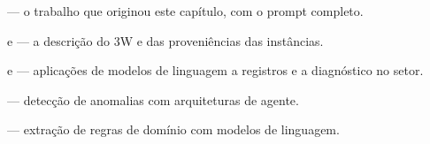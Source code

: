 \begin{leituras}
\item \citet{Lopes2026LLM} --- o trabalho que originou este capítulo, com o prompt
      completo.
\item \citet{VARGAS2019} e \citet{VazVargas2026_3w2} --- a descrição do 3W e das
      proveniências das instâncias.
\item \citet{Ma2024wellrecords} e \citet{Wei2024leakage} --- aplicações de modelos de
      linguagem a registros e a diagnóstico no setor.
\item \citet{Belay2026agenticAD} --- detecção de anomalias com arquiteturas de agente.
\item \citet{Zhang2026llmrules} --- extração de regras de domínio com modelos de
      linguagem.
\end{leituras}
